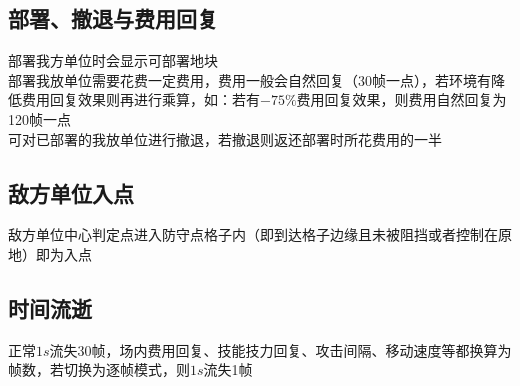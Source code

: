 \documentclass[a4paper, 12pt]{article}
\begin{document}
		\subsection{部署、撤退与费用回复}
			部署我方单位时会显示可部署地块\\
			\indent 部署我放单位需要花费一定费用，费用一般会自然回复（30帧一点），若环境有降低费用回复效果则再进行乘算，如：若有$-75\%$费用回复效果，则费用自然回复为120帧一点\\
			\indent 可对已部署的我放单位进行撤退，若撤退则返还部署时所花费用的一半
		\subsection{敌方单位入点}
			敌方单位中心判定点进入防守点格子内（即到达格子边缘且未被阻挡或者控制在原地）即为入点
		\subsection{时间流逝}
			正常$1s$流失30帧，场内费用回复、技能技力回复、攻击间隔、移动速度等都换算为帧数，若切换为逐帧模式，则$1s$流失1帧
\end{document}
